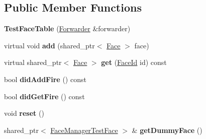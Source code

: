 \subsection*{Public Member Functions}
\begin{DoxyCompactItemize}
\item 
{\bfseries Test\+Face\+Table} (\hyperlink{classnfd_1_1Forwarder}{Forwarder} \&forwarder)\hypertarget{classnfd_1_1tests_1_1TestFaceTable_a9a7593baaab22364a0d0d06dda9c524b}{}\label{classnfd_1_1tests_1_1TestFaceTable_a9a7593baaab22364a0d0d06dda9c524b}

\item 
virtual void {\bfseries add} (shared\+\_\+ptr$<$ \hyperlink{classnfd_1_1Face}{Face} $>$ face)\hypertarget{classnfd_1_1tests_1_1TestFaceTable_a3e221d8822ef0d3de7adf885180b4211}{}\label{classnfd_1_1tests_1_1TestFaceTable_a3e221d8822ef0d3de7adf885180b4211}

\item 
virtual shared\+\_\+ptr$<$ \hyperlink{classnfd_1_1Face}{Face} $>$ {\bfseries get} (\hyperlink{classFaceId}{Face\+Id} id) const\hypertarget{classnfd_1_1tests_1_1TestFaceTable_ae35039b3e49701f1b571e73ca7425a59}{}\label{classnfd_1_1tests_1_1TestFaceTable_ae35039b3e49701f1b571e73ca7425a59}

\item 
bool {\bfseries did\+Add\+Fire} () const\hypertarget{classnfd_1_1tests_1_1TestFaceTable_a0d915cd8849b0535af3e4883a6f8f0c1}{}\label{classnfd_1_1tests_1_1TestFaceTable_a0d915cd8849b0535af3e4883a6f8f0c1}

\item 
bool {\bfseries did\+Get\+Fire} () const\hypertarget{classnfd_1_1tests_1_1TestFaceTable_a7d9c9eb0d2b748a5a7ba949081fbb550}{}\label{classnfd_1_1tests_1_1TestFaceTable_a7d9c9eb0d2b748a5a7ba949081fbb550}

\item 
void {\bfseries reset} ()\hypertarget{classnfd_1_1tests_1_1TestFaceTable_a1ace9f88385e899219649b6e2e866e2a}{}\label{classnfd_1_1tests_1_1TestFaceTable_a1ace9f88385e899219649b6e2e866e2a}

\item 
shared\+\_\+ptr$<$ \hyperlink{classnfd_1_1tests_1_1FaceManagerTestFace}{Face\+Manager\+Test\+Face} $>$ \& {\bfseries get\+Dummy\+Face} ()\hypertarget{classnfd_1_1tests_1_1TestFaceTable_a1a3cac23a333123e4131cfa3b383c28d}{}\label{classnfd_1_1tests_1_1TestFaceTable_a1a3cac23a333123e4131cfa3b383c28d}

\end{DoxyCompactItemize}
